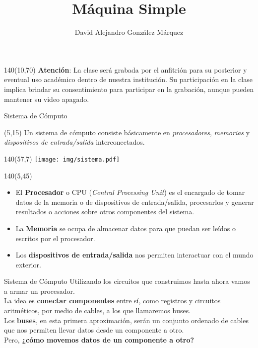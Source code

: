 \documentclass[aspectratio=169]{beamer}
\title{\Huge Máquina Simple}
\author{David Alejandro González Márquez}
\date{}
\begin{document}
\begin{frame}[plain]
    \titlepage
    \begin{textblock}{140}(10,70)
    \textcolor{rojo}{
    \textbf{Atención}: La clase será grabada por el anfitrión para su posterior y eventual uso académico dentro de nuestra institución. Su participación en la clase implica brindar su consentimiento para participar en la grabación, aunque pueden mantener su video apagado.}
    \end{textblock}
\end{frame}

\begin{frame}[fragile]{Sistema de Cómputo}
    \begin{textblock}{50}(5,15)
    Un sistema de cómputo consiste básicamente en \emph{procesadores}, \emph{memorias} y \emph{dispositivos de entrada/salida} interconectados.
    \end{textblock}
    \begin{textblock}{140}(57,7)
    \texttt{[image: img/sistema.pdf]}
    \end{textblock}
    \begin{textblock}{140}(5,45)
    \begin{itemize}
    \item<2-> El \textbf{Procesador} o CPU (\emph{Central Processing Unit}) es el encargado de tomar datos de la memoria o de dispositivos de entrada/salida, procesarlos y generar resultados o acciones sobre otros componentes del sistema.
    \item<3-> La \textbf{Memoria} se ocupa de almacenar datos para que puedan ser leídos o escritos por el procesador.
    \item<4-> Los \textbf{dispositivos de entrada/salida} nos permiten interactuar con el mundo exterior.
    \end{itemize}
    \end{textblock}
\end{frame}

\begin{frame}[fragile]{Sistema de Cómputo}
    Utilizando los circuitos que construimos hasta ahora vamos a armar un procesador.\\
    \bigskip
    La idea es \textbf{conectar componentes} entre sí, como registros y circuitos aritméticos, por medio de cables, a los que llamaremos buses.\\
    \bigskip
    Los \textbf{buses}, en esta primera aproximación, serán un conjunto ordenado de cables que nos permiten llevar datos desde un componente a otro.\\
    \bigskip
    Pero, \textbf{\textcolor{naranjauca}{¿cómo movemos datos de un componente a otro?}}
\end{frame}
\end{document}
